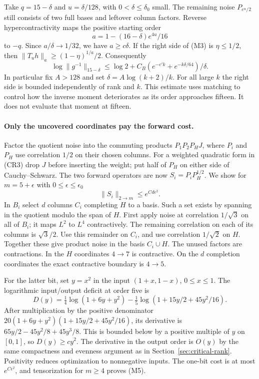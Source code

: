 Take $q=15-\delta$ and $u=\delta/128$, with $0<\delta\le\delta_0$ small. The remaining noise $P_{e^u/2}$ still consists of two full bases and leftover column factors. Reverse hypercontractivity maps the positive starting order
\[
 a=1-(16-\delta)e^{4u}/16
\]
to $-q$. Since $a/\delta\to1/32$, we have $a\ge c\delta$. If the right side of (M3) is $\eta\le1/2$, then $\|T_u h\|_a\ge(1-\eta)^{1/a}/2$. Consequently
\[
 \log\|g^{-1}\|_{15-\delta}\le \log 2+
       C_B(e^{-c'k}+e^{-k\delta/64})/\delta .                  \tag{M4}
\]
In particular fix $A>128$ and set $\delta=A\log(k+2)/k$. For all large $k$ the right side is bounded independently of rank and $k$. This estimate uses matching to control how the inverse moment deteriorates as its order approaches fifteen. It does not evaluate that moment at fifteen.

\paragraph{Only the uncovered coordinates pay the forward cost.}
Factor the quotient noise into the commuting products $P_1P_2P_H J$, where $P_i$ and $P_H$ use correlation $1/2$ on their chosen columns. For a weighted quadratic form in (CR3) drop $J$ before inserting the weight; put half of $P_H$ on either side of Cauchy--Schwarz. The two forward operators are now $S_i=P_iP_H^{1/2}$. We show for $m=5+\epsilon$ with $0\le\epsilon\le\epsilon_0$
\[
                      \|S_i\|_{2\to m}\le e^{Cd\epsilon^2}.     \tag{M5}
\]
In $B_i$ select $d$ columns $C_i$ completing $H$ to a basis. Such a set exists by spanning in the quotient modulo the span of $H$. First apply noise at correlation $1/\sqrt3$ on all of $B_i$; it maps $L^2$ to $L^4$ contractively. The remaining correlation on each of its columns is $\sqrt3/2$. Use this remainder on $C_i$, and use correlation $1/\sqrt2$ on $H$. Together these give product noise in the basis $C_i\cup H$. The unused factors are contractions. In the $H$ coordinates $4\to7$ is contractive. On the $d$ completion coordinates the exact contractive boundary is $4\to5$.

For the latter bit, set $y=x^2$ in the input $(1+x,1-x)$, $0\le x\le1$. The logarithmic input/output deficit at order five is
\[
 D(y)=\tfrac14\log(1+6y+y^2)-\tfrac15\log(1+15y/2+45y^2/16).
\]
After multiplication by the positive denominator $20(1+6y+y^2)(1+15y/2+45y^2/16)$, its derivative is
$65y/2-45y^2/8+45y^3/8$. This is bounded below by a positive multiple of $y$ on $[0,1]$, so $D(y)\ge c y^2$. The derivative in the output order is $O(y)$ by the same compactness and evenness argument as in Section~\ref{sec:critical-rank}. Positivity reduces optimization to nonnegative inputs. The one-bit cost is at most $e^{C\epsilon^2}$, and tensorization for $m\ge4$ proves (M5).

